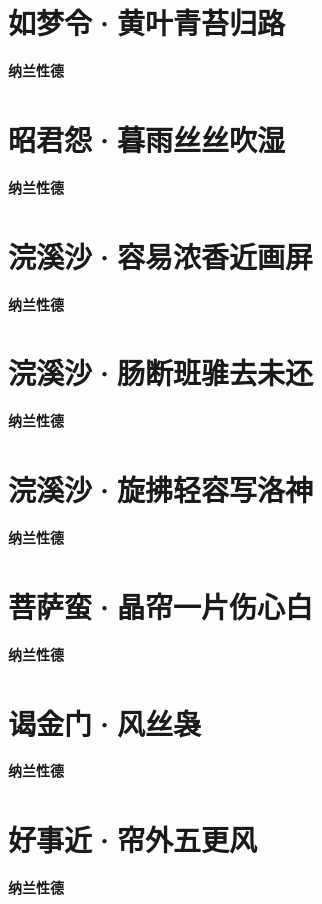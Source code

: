 \documentclass[12pt,a4paper]{ctexbook}
\begin{document}
\section{如梦令·黄叶青苔归路}
\textbf{纳兰性德}\par\vspace{0.5em}

\section{昭君怨·暮雨丝丝吹湿}
\textbf{纳兰性德}\par\vspace{0.5em}

\section{浣溪沙·容易浓香近画屏}
\textbf{纳兰性德}\par\vspace{0.5em}

\section{浣溪沙·肠断班骓去未还}
\textbf{纳兰性德}\par\vspace{0.5em}

\section{浣溪沙·旋拂轻容写洛神}
\textbf{纳兰性德}\par\vspace{0.5em}

\section{菩萨蛮·晶帘一片伤心白}
\textbf{纳兰性德}\par\vspace{0.5em}

\section{谒金门·风丝袅}
\textbf{纳兰性德}\par\vspace{0.5em}

\section{好事近·帘外五更风}
\textbf{纳兰性德}\par\vspace{0.5em}
\end{document}
